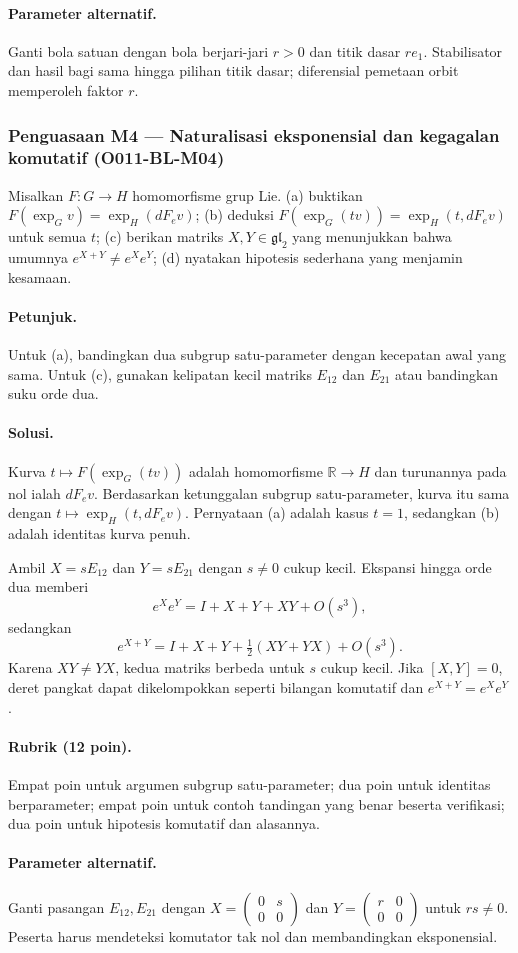 \paragraph{Parameter alternatif.}
Ganti bola satuan dengan bola berjari-jari $r>0$ dan titik dasar $re_1$.
Stabilisator dan hasil bagi sama hingga pilihan titik dasar; diferensial
pemetaan orbit memperoleh faktor $r$.

\subsubsection*{Penguasaan M4 — Naturalisasi eksponensial dan kegagalan komutatif (O011-BL-M04)}
\label{o011-bl-m04}

Misalkan $F\colon G\to H$ homomorfisme grup Lie. (a) buktikan
$F(\exp_Gv)=\exp_H(dF_ev)$; (b) deduksi
$F(\exp_G(tv))=\exp_H(t,dF_ev)$ untuk semua $t$; (c) berikan matriks
$X,Y\in\mathfrak{gl}_2$ yang menunjukkan bahwa umumnya
$e^{X+Y}\ne e^Xe^Y$; (d) nyatakan hipotesis sederhana yang menjamin kesamaan.

\paragraph{Petunjuk.}
Untuk (a), bandingkan dua subgrup satu-parameter dengan kecepatan awal yang
sama. Untuk (c), gunakan kelipatan kecil matriks $E_{12}$ dan $E_{21}$ atau
bandingkan suku orde dua.

\paragraph{Solusi.}
Kurva $t\mapsto F(\exp_G(tv))$ adalah homomorfisme
$\mathbb R\to H$ dan turunannya pada nol ialah $dF_ev$. Berdasarkan ketunggalan
subgrup satu-parameter, kurva itu sama dengan
$t\mapsto\exp_H(t,dF_ev)$. Pernyataan (a) adalah kasus $t=1$, sedangkan (b)
adalah identitas kurva penuh.

Ambil $X=sE_{12}$ dan $Y=sE_{21}$ dengan $s\ne0$ cukup kecil. Ekspansi hingga
orde dua memberi
\[
 e^Xe^Y=I+X+Y+XY+O(s^3),
\]
sedangkan
\[
 e^{X+Y}=I+X+Y+\tfrac12(XY+YX)+O(s^3).
\]
Karena $XY\ne YX$, kedua matriks berbeda untuk $s$ cukup kecil. Jika
$[X,Y]=0$, deret pangkat dapat dikelompokkan seperti bilangan komutatif dan
$e^{X+Y}=e^Xe^Y$.

\paragraph{Rubrik (12 poin).}
Empat poin untuk argumen subgrup satu-parameter; dua poin untuk identitas
berparameter; empat poin untuk contoh tandingan yang benar beserta verifikasi;
dua poin untuk hipotesis komutatif dan alasannya.

\paragraph{Parameter alternatif.}
Ganti pasangan $E_{12},E_{21}$ dengan
$X=\left(\begin{smallmatrix}0&s\\0&0\end{smallmatrix}\right)$ dan
$Y=\left(\begin{smallmatrix}r&0\\0&0\end{smallmatrix}\right)$ untuk $rs\ne0$.
Peserta harus mendeteksi komutator tak nol dan membandingkan eksponensial.
